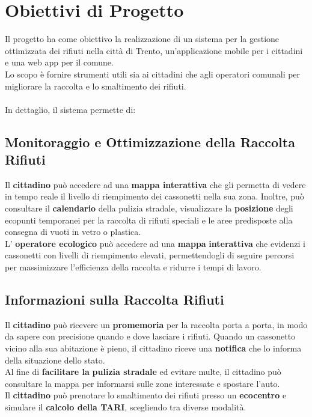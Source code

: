 \section{Obiettivi di Progetto}

    Il progetto ha come obiettivo la realizzazione di un sistema per la gestione ottimizzata dei rifiuti nella citt\`a di Trento, un'applicazione mobile per i cittadini e una web app per il comune. \\Lo scopo è fornire strumenti utili sia ai cittadini che agli operatori comunali per migliorare la raccolta e lo smaltimento dei rifiuti.
    \\ \\In dettaglio, il sistema permette di:

\subsection{Monitoraggio e Ottimizzazione della Raccolta Rifiuti}

    Il \textbf{cittadino} può accedere ad una \textbf{mappa interattiva} che gli permetta di vedere in tempo reale il livello di riempimento dei cassonetti nella sua zona. Inoltre, può consultare il \textbf{calendario} della pulizia stradale, visualizzare la \textbf{posizione} degli ecopunti temporanei per la raccolta di rifiuti speciali e le aree predisposte alla consegna di vuoti in vetro o plastica.
    \\L' \textbf{operatore ecologico} può accedere ad una \textbf{mappa} \textbf{interattiva} che evidenzi i cassonetti con livelli di riempimento
    elevati, permettendogli di seguire percorsi per massimizzare l’efficienza della raccolta e ridurre i tempi di lavoro.

\subsection{Informazioni sulla Raccolta Rifiuti}

    Il \textbf{cittadino} può ricevere un \textbf{promemoria} per la raccolta porta a porta, in modo da sapere con precisione quando e dove lasciare i rifiuti. Quando un cassonetto vicino alla sua abitazione è pieno, il cittadino riceve una \textbf{notifica} che lo informa della situazione dello stato.\\Al fine di \textbf{facilitare la} \textbf{pulizia stradale}\textbf{ }ed evitare multe, il cittadino può consultare la mappa per informarsi sulle zone interessate e spostare l'auto.
    \\Il \textbf{cittadino} può prenotare lo smaltimento dei rifiuti presso un \textbf{ecocentro} e simulare il \textbf{calcolo della TARI}, scegliendo tra diverse modalità.

